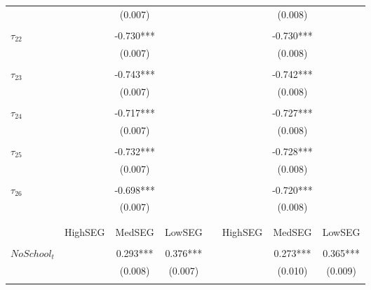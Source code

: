 \begin{tabular}{@{\extracolsep{-2pt}}lccccccc}
            &      &  (0.007)  &          &&      &  (0.008)  &            \\
            &      &           &          &&      &           &            \\[-2.1ex]
$\tau_{22}$ &      & -0.730*** &          &&      & -0.730*** &            \\
            &      &  (0.007)  &          &&      &  (0.008)  &            \\
            &      &           &          &&      &           &            \\[-2.1ex]
$\tau_{23}$ &      & -0.743*** &          &&      & -0.742*** &            \\
            &      &  (0.007)  &          &&      &  (0.008)  &            \\
            &      &           &          &&      &           &            \\[-2.1ex]
$\tau_{24}$ &      & -0.717*** &          &&      & -0.727*** &            \\
            &      &  (0.007)  &          &&      &  (0.008)  &            \\
            &      &           &          &&      &           &            \\[-2.1ex]
$\tau_{25}$ &      & -0.732*** &          &&      & -0.728*** &            \\
            &      &  (0.007)  &          &&      &  (0.008)  &            \\
            &      &           &          &&      &           &            \\[-2.1ex]
$\tau_{26}$ &      & -0.698*** &          &&      & -0.720*** &            \\
            &      &  (0.007)  &          &&      &  (0.008)  &            \\
            &      &           &          &&      &           &            \\[-2.1ex]
\cline{2-4} \cline{6-8} \\ [-1.5ex]      
                    &   HighSEG &    MedSEG &   LowSEG  &&   HighSEG &    MedSEG &   LowSEG  \\\\[-.7ex]  
$NoSchool_t$        &           &  0.293*** &  0.376*** &&           &  0.273*** &  0.365*** \\
                    &           &   (0.008) &   (0.007) &&           &   (0.010) &   (0.009) \\
                    &           &           &           &&           &           &           \\[-2.1ex]

\end{tabular}
